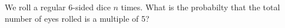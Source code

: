 We roll a regular 6-sided dice $n$ times. What is the probabilty that the total number of eyes rolled is a multiple of 5?